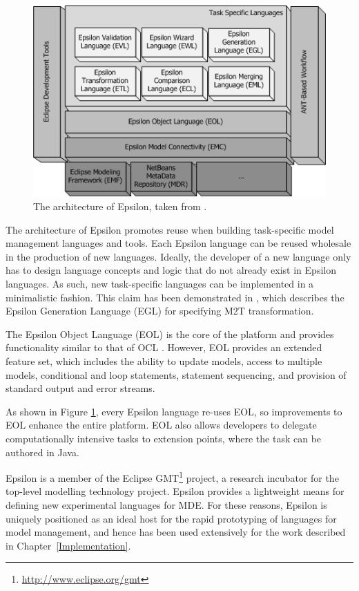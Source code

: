 \begin{figure}[htbp]
  \begin{center}
    \leavevmode
    \includegraphics[scale=0.6]{2.Background/images/epsilon.png}
  \end{center}
  \caption[The architecture of Epsilon]{The architecture of Epsilon, taken from \cite{rose08egl}.}
  \label{fig:epsilon}
\end{figure}

The architecture of Epsilon promotes reuse when building task-specific model management languages and tools. Each Epsilon language can be reused wholesale in the production of new languages. Ideally, the developer of a new language only has to design language concepts and logic that do not already exist in Epsilon languages. As such, new task-specific languages can be implemented in a minimalistic fashion. This claim has been demonstrated in \cite{rose08egl}, which describes the Epsilon Generation Language (EGL) for specifying M2T transformation.

The Epsilon Object Language (EOL) \cite{kolovos06eol} is the core of the platform and provides functionality similar to that of OCL \cite{ocl2}. However, EOL provides an extended feature set, which includes the ability to update models, access to multiple models, conditional and loop statements, statement sequencing, and provision of standard output and error streams.

As shown in Figure \ref{fig:epsilon}, every Epsilon language re-uses EOL, so improvements to EOL enhance the entire platform. EOL also allows developers to delegate computationally intensive tasks to extension points, where the task can be authored in Java.

Epsilon is a member of the Eclipse GMT\footnote{\url{http://www.eclipse.org/gmt}} project, a research incubator for the top-level modelling technology project. Epsilon provides a lightweight means for defining new experimental languages for MDE. For these reasons, Epsilon is uniquely positioned as an ideal host for the rapid prototyping of languages for model management, and hence has been used extensively for the work described in Chapter~\ref{Implementation}. 

